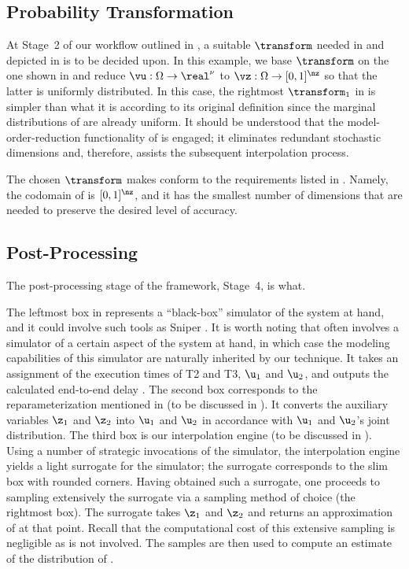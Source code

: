 \subsection{Probability Transformation}

At Stage~2 of our workflow outlined in , a suitable
$\transform$ needed in  and depicted in
 is to be decided upon. In this example, we base
$\transform$ on the one shown in  and reduce
$\vu: \Omega \to \real^\nu$ to $\vz: \Omega \to [0, 1]^\nz$ so that the latter
is uniformly distributed. In this case, the rightmost $\transform_1$ in
 is simpler than what it is according to its
original definition since the marginal distributions of \vz are already uniform.
It should be understood that the model-order-reduction functionality of
 is engaged; it eliminates redundant stochastic
dimensions and, therefore, assists the subsequent interpolation process.

The chosen $\transform$ makes \vz conform to the requirements listed in
. Namely, the codomain of \vz is $[0, 1]^\nz$,
and it has the smallest number of dimensions that are needed to preserve the
desired level of accuracy.

\subsection{Post-Processing}

The post-processing stage of the framework, Stage~4, is what.

The leftmost box in  represents a ``black-box''
simulator of the system at hand, and it could involve such tools as Sniper
\cite{carlson2011}. It is worth noting that \g often involves a simulator of a
certain aspect of the system at hand, in which case the modeling capabilities of
this simulator are naturally inherited by our technique. It takes an assignment
of the execution times of T2 and T3, $\u_1$ and $\u_2$, and outputs the
calculated end-to-end delay \g. The second box corresponds to the
reparameterization mentioned in  (to be discussed in
). It converts the auxiliary variables $\z_1$ and $\z_2$ into
$\u_1$ and $\u_2$ in accordance with $\u_1$ and $\u_2$'s joint distribution. The
third box is our interpolation engine (to be discussed in ).
Using a number of strategic invocations of the simulator, the interpolation
engine yields a light surrogate for the simulator; the surrogate corresponds to
the slim box with rounded corners. Having obtained such a surrogate, one
proceeds to sampling extensively the surrogate via a sampling method of choice
(the rightmost box). The surrogate takes $\z_1$ and $\z_2$ and returns an
approximation of \g at that point. Recall that the computational cost of this
extensive sampling is negligible as \g is not involved. The samples are then
used to compute an estimate of the distribution of \g.

